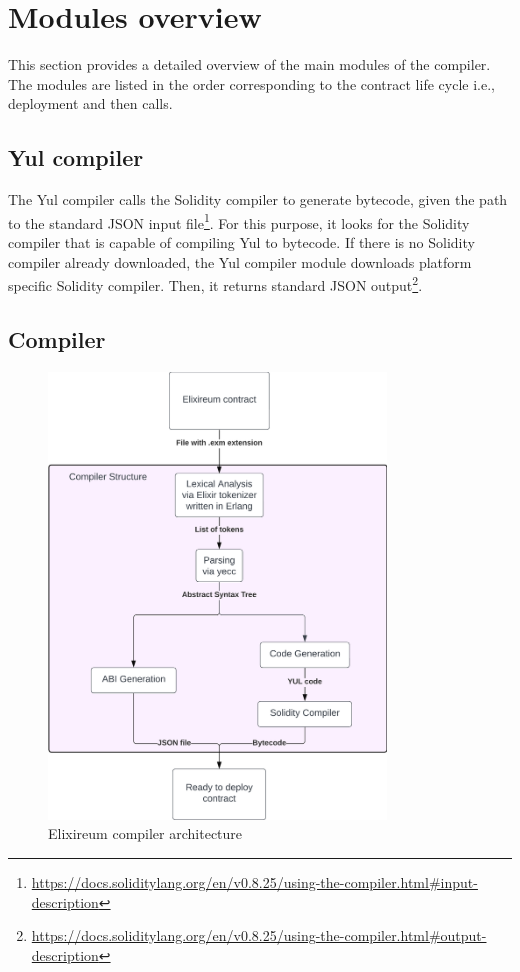 \section{Modules overview}
This section provides a detailed overview of the main modules of the compiler. The modules are listed in the order corresponding to the contract life cycle i.e., deployment and then calls.
\subsection{Yul compiler}
The Yul compiler calls the Solidity compiler to generate bytecode, given the path to the standard JSON input file\footnote{\url{https://docs.soliditylang.org/en/v0.8.25/using-the-compiler.html\#input-description}}. For this purpose, it looks for the Solidity compiler that is capable of compiling Yul to bytecode. If there is no Solidity compiler already downloaded, the Yul compiler module downloads platform specific Solidity compiler. Then, it returns standard JSON output\footnote{\url{https://docs.soliditylang.org/en/v0.8.25/using-the-compiler.html\#output-description}}.
\subsection{Compiler}
\label{ssec:compiler}


\begin{figure}[h!]
  \centering
  \includegraphics[width=0.8\textwidth]{figs/arch.png}
  \caption{Elixireum compiler architecture}
  \label{fig:arch}
\end{figure}

